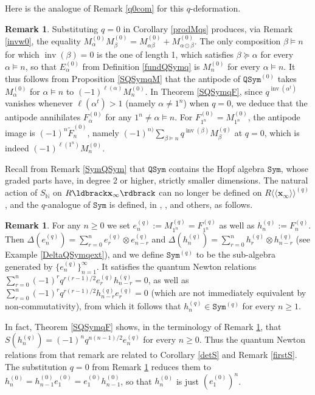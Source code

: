 \documentclass{article}
\theoremstyle{definition}
\newtheorem{rmk}[thm]{Remark}
\begin{document}
Here is the analogue of Remark \ref{q0com} for this $q$-deformation.
\begin{rmk}
Substituting $q=0$ in Corollary \ref{prodMqs} produces, via Remark \ref{invw0}, the equality $M_{\alpha}^{(0)}M_{\beta}^{(0)}=M_{\alpha\beta}^{(0)}+M_{\alpha\odot\beta}^{(0)}$. The only composition $\beta \vDash n$ for which $\operatorname{inv}(\beta)=0$ is the one of length 1, which satisfies $\beta\succeq\alpha$ for every $\alpha \vDash n$, so that $E_{\alpha}^{(0)}$ from Definition \ref{fundQSymq} is $M_{n}^{(0)}$ for every $\alpha \vDash n$. It thus follows from Proposition \ref{SQSymqM} that the antipode of $\mathtt{QSym}^{(0)}$ takes $M_{\alpha}^{(0)}$ for $\alpha \vDash n$ to $(-1)^{\ell(\alpha)}M_{n}^{(0)}$. In Theorem \ref{SQSymqF}, since $q^{\operatorname{inv}(\alpha^{t})}$ vanishes whenever $\ell(\alpha^{t})>1$ (namely $\alpha\neq1^{n}$) when $q=0$, we deduce that the antipode annihilates $F_{\alpha}^{(0)}$ for any $1^{n}\neq\alpha \vDash n$. For $F_{1^{n}}^{(0)}=M_{1^{n}}^{(0)}$, the antipode image is $(-1)^{n}\widetilde{F}_{n}^{(0)}$, namely $(-1)^{n)}\sum_{\beta \vDash n}q^{\operatorname{inv}(\beta)}M_{\beta}^{(q)}$ at $q=0$, which is indeed $(-1)^{\ell(1^{n})}M_{n}^{(0)}$. \label{q0nc}
\end{rmk}

\medskip

Recall from Remark \ref{SymQSym} that $\mathtt{QSym}$ contains the Hopf algebra $\mathtt{Sym}$, whose graded parts have, in degree 2 or higher, strictly smaller dimensions. The natural action of $S_{\mathbb{N}}$ on $R\ldbrack\mathbf{x}_{\infty}\rdbrack$ can no longer be defined on $R\langle\langle\mathbf{x}_{\infty}\rangle\rangle^{(q)}$, and the $q$-analogue of $\mathtt{Sym}$ is defined, in \cite{[EK]}, \cite{[L]}, and others, as follows.
\begin{rmk}
For any $n\geq0$ we set $e_{n}^{(q)}:=M_{1^{n}}^{(q)}=F_{1^{n}}^{(q)}$ as well as $h_{n}^{(q)}:=F_{n}^{(q)}$. Then $\Delta(e_{n}^{(q)})=\sum_{r=0}^{n}e_{r}^{(q)} \otimes e_{n-r}^{(q)}$ and $\Delta(h_{n}^{(q)})=\sum_{r=0}^{n}h_{r}^{(q)} \otimes h_{n-r}^{(q)}$ (see Example \ref{DeltaQSymqext}), and we define $\mathtt{Sym}^{(q)}$ to be the sub-algebra generated by $\{e_{n}^{(q)}\}_{n=1}^{\infty}$. It satisfies the quantum Newton relations $\sum_{r=0}^{n}(-1)^{r}q^{r(r-1)/2}e_{r}^{(q)}h_{n-r}^{(q)}=0$, as well as $\sum_{r=0}^{n}(-1)^{r}q^{r(r-1)/2}h_{n-r}^{(q)}e_{r}^{(q)}=0$ (which are not immediately equivalent by non-commutativity), from which it follows that $h_{n}^{(q)}\in\mathtt{Sym}^{(q)}$ for every $n\geq1$. \label{SymQSymq}
\end{rmk}
In fact, Theorem \ref{SQSymqF} shows, in the terminology of Remark \ref{SymQSymq}, that $S(h_{n}^{(q)})=(-1)^{n}q^{n(n-1)/2}e_{n}^{(q)}$ for every $n\geq0$. Thus the quantum Newton relations from that remark are related to Corollary \ref{detS} and Remark \ref{firstS}. The substitution $q=0$ from Remark \ref{q0nc} reduces them to $h_{n}^{(0)}=h_{n-1}^{(0)}e_{1}^{(0)}=e_{1}^{(0)}h_{n-1}^{(0)}$, so that $h_{n}^{(0)}$ is just $(e_{1}^{(0)})^{n}$.
\end{document}
